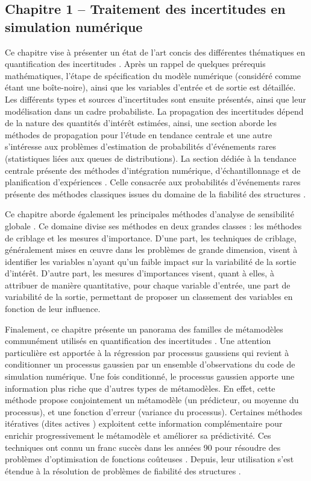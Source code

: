 \subsection*{Chapitre 1 -- Traitement des incertitudes en simulation numérique}
Ce chapitre vise à présenter un état de l'art concis des différentes thématiques en quantification des incertitudes \citep{sullivan_2015}. 
Après un rappel de quelques prérequis mathématiques, l'étape de spécification du modèle numérique (considéré comme étant une boîte-noire), ainsi que les variables d'entrée et de sortie est détaillée. 
Les différents types et sources d'incertitudes sont ensuite présentés, ainsi que leur modélisation dans un cadre probabiliste. 
La propagation des incertitudes dépend de la nature des quantités d'intérêt estimées, ainsi, une section aborde les méthodes de propagation pour l'étude en tendance centrale et une autre s'intéresse aux problèmes d'estimation de probabilités d'événements rares (statistiques liées aux queues de distributions). 
La section dédiée à la tendance centrale présente des méthodes d'intégration numérique, d'échantillonnage et de planification d'expériences \citep{fang_liu_2018}. 
Celle consacrée aux probabilités d'événements rares présente des méthodes classiques issues du domaine de la fiabilité des structures \citep{lemaire_2009,MorioBalesdent2015}.

Ce chapitre aborde également les principales méthodes d'analyse de sensibilité globale \citep{daveiga_iooss_2021}. 
Ce domaine divise ses méthodes en deux grandes classes : les méthodes de criblage et les mesures d'importance. 
D'une part, les techniques de criblage, généralement mises en \oe{}uvre dans les problèmes de grande dimension, visent à identifier les variables n'ayant qu'un faible impact sur la variabilité de la sortie d'intérêt. 
D'autre part, les mesures d'importances visent, quant à elles, à attribuer de manière quantitative, pour chaque variable d'entrée, une part de variabilité de la sortie, permettant de proposer un classement des variables en fonction de leur influence.

Finalement, ce chapitre présente un panorama des familles de métamodèles communément utilisés en quantification des incertitudes \citep{forrester_2008}. 
Une attention particulière est apportée à la régression par processus gaussiens qui revient à conditionner un processus gaussien par un ensemble d'observations du code de simulation numérique. 
Une fois conditionné, le processus gaussien apporte une information plus riche que d'autres types de métamodèles. 
En effet, cette méthode propose conjointement un métamodèle (un prédicteur, ou moyenne du processus), et une fonction d'erreur (variance du processus). 
Certaines méthodes itératives (dites \og actives \fg{}) exploitent cette information complémentaire pour enrichir progressivement le métamodèle et améliorer sa prédictivité. 
Ces techniques ont connu un franc succès dans les années 90 pour résoudre des problèmes d'optimisation de fonctions coûteuses \citep{jones_1998}. 
Depuis, leur utilisation s'est étendue à la résolution de problèmes de fiabilité des structures \citep{echard_2011}.

